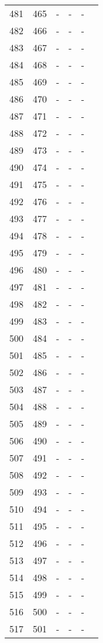 \documentclass[10pt]{article}
\begin{document}
\begin{longtable}{llllll}
  481 & 465 & - & - & - &  \\ 
  482 & 466 & - & - & - &  \\ 
  483 & 467 & - & - & - &  \\ 
  484 & 468 & - & - & - &  \\ 
  485 & 469 & - & - & - &  \\ 
  486 & 470 & - & - & - &  \\ 
  487 & 471 & - & - & - &  \\ 
  488 & 472 & - & - & - &  \\ 
  489 & 473 & - & - & - &  \\ 
  490 & 474 & - & - & - &  \\ 
  491 & 475 & - & - & - &  \\ 
  492 & 476 & - & - & - &  \\ 
  493 & 477 & - & - & - &  \\ 
  494 & 478 & - & - & - &  \\ 
  495 & 479 & - & - & - &  \\ 
  496 & 480 & - & - & - &  \\ 
  497 & 481 & - & - & - &  \\ 
  498 & 482 & - & - & - &  \\ 
  499 & 483 & - & - & - &  \\ 
  500 & 484 & - & - & - &  \\ 
  501 & 485 & - & - & - &  \\ 
  502 & 486 & - & - & - &  \\ 
  503 & 487 & - & - & - &  \\ 
  504 & 488 & - & - & - &  \\ 
  505 & 489 & - & - & - &  \\ 
  506 & 490 & - & - & - &  \\ 
  507 & 491 & - & - & - &  \\ 
  508 & 492 & - & - & - &  \\ 
  509 & 493 & - & - & - &  \\ 
  510 & 494 & - & - & - &  \\ 
  511 & 495 & - & - & - &  \\ 
  512 & 496 & - & - & - &  \\ 
  513 & 497 & - & - & - &  \\ 
  514 & 498 & - & - & - &  \\ 
  515 & 499 & - & - & - &  \\ 
  516 & 500 & - & - & - &  \\ 
  517 & 501 & - & - & - &  \\ 

\end{longtable}
\end{document}
